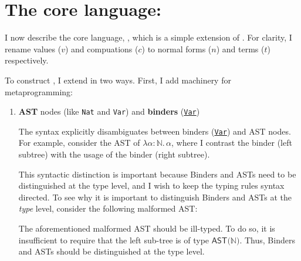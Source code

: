 \section{The core language: \texorpdfstring{\coreLang{}}{Lambda-Op-AST}}\label{section:core-lang}
I now describe the core language, \coreLang{}, which is a simple extension of \efflang{}. For clarity, I rename \efflang{} values ($v$) and compuations ($c$) to \coreLang{} normal forms ($n$) and terms ($t$) respectively.  

To construct \coreLang{}, I extend \efflang{} in two ways. First, I add machinery for metaprogramming:

\begin{enumerate}
\item \textbf{AST} nodes (like \texttt{Nat} and \texttt{Var}) and \textbf{binders} (\underline{\texttt{Var}})

The syntax explicitly disambiguates between binders (\underline{\texttt{Var}}) and AST nodes. For example, consider the AST of $\lambda\alpha{}$${:}\mathbb{N}. \,\alpha$, where I contrast the binder (left subtree) with the usage of the binder (right subtree).

\begin{center}
\end{center}

This syntactic distinction is important because \textsf{Binder}s and \textsf{AST}s need to be distinguished at the type level, and I wish to keep the typing rules syntax directed. To see why it is important to distinguish \textsf{Binder}s and \textsf{AST}s at the \textit{type} level, consider the following malformed AST:
\begin{center}
\end{center}

The aforementioned malformed AST should be ill-typed. To do so, it is insufficient to require that the left sub-tree is of type $\textsf{AST($\mathbb{N}$)}$. Thus, \textsf{Binder}s and \textsf{ASTs} should be distinguished at the type level. 


\end{enumerate}
